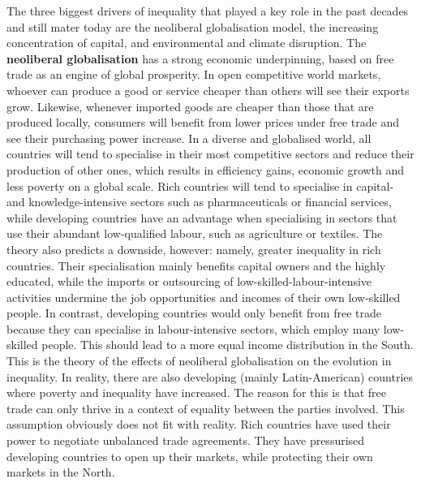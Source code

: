 \documentclass[../summary.tex]{subfiles}
\begin{document}
The three biggest drivers of inequality that played a key role in the past decades and still mater today are the neoliberal globalisation model, the increasing concentration of capital, and environmental and climate disruption.
\newpage
The \textbf{neoliberal globalisation} has a strong economic underpinning, based on free trade as an engine of global prosperity. In open competitive world markets, whoever can produce a good or service cheaper than others will see their exports grow. Likewise, whenever imported goods are cheaper than those that are produced locally, consumers will benefit from lower prices under free trade and see their purchasing power increase. In a diverse and globalised world, all countries will tend to specialise in their most competitive sectors and reduce their production of other ones, which results in efficiency gains, economic growth and less poverty on a global scale. Rich countries will tend to specialise in capital- and knowledge-intensive sectors such as pharmaceuticals or financial services, while developing countries have an advantage when specialising in sectors that use their abundant low-qualified labour, such as agriculture or textiles. The theory also predicts a downside, however: namely, greater inequality in rich countries. Their specialisation mainly benefits capital owners and the highly educated, while the imports or outsourcing of low-skilled-labour-intensive activities undermine the job opportunities and incomes of their own low-skilled people. In contrast, developing countries would only benefit from free trade because they can specialise in labour-intensive sectors, which employ many low-skilled people. This should lead to a more equal income distribution in the South. This is the theory of the effects of neoliberal globalisation on the evolution in inequality. In reality, there are also developing (mainly Latin-American) countries where poverty and inequality have increased. The reason for this is that free trade can only thrive in a context of equality between the parties involved. This assumption obviously does not fit with reality. Rich countries have used their power to negotiate unbalanced trade agreements. They have pressurised developing countries to open up their markets, while protecting their own markets in the North.
\\\\
\end{document}
